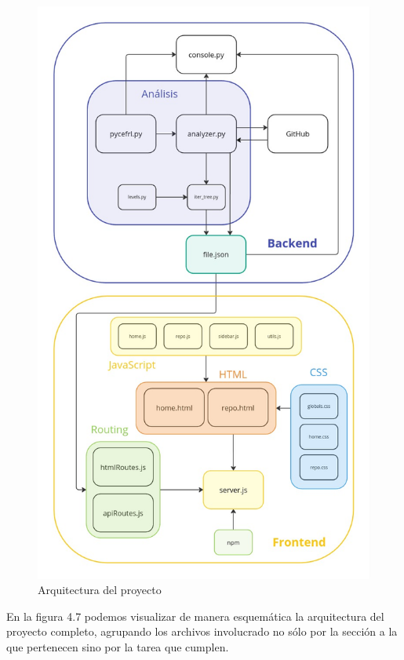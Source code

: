\documentclass[a4paper, 12pt]{book}
\begin{document}
\begin{figure}
    \centering
    \includegraphics[height=\textheight]{img/arquitectura_total_final.jpg}
    \caption{Arquitectura del proyecto}
    \label{fig:enter-label}
\end{figure}

En la figura 4.7 podemos visualizar de manera esquemática la arquitectura del proyecto completo, agrupando los archivos involucrado no sólo por la sección a la que pertenecen sino por la tarea que cumplen.
\end{document}
